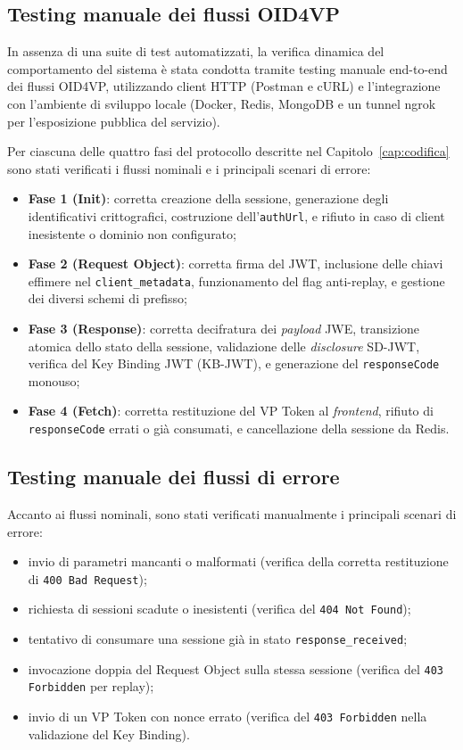 \subsection{Testing manuale dei flussi OID4VP}
In assenza di una suite di test automatizzati, la verifica dinamica del comportamento del sistema è stata condotta tramite testing manuale end-to-end dei flussi OID4VP, utilizzando client HTTP (Postman e cURL) e l'integrazione con l'ambiente di sviluppo locale (Docker, Redis, MongoDB e un tunnel ngrok per l'esposizione pubblica del servizio).

Per ciascuna delle quattro fasi del protocollo descritte nel Capitolo~\ref{cap:codifica} sono stati verificati i flussi nominali e i principali scenari di errore:

\begin{itemize}
    \item \textbf{Fase 1 (Init)}: corretta creazione della sessione, generazione degli identificativi crittografici, costruzione dell'\texttt{authUrl}, e rifiuto in caso di client inesistente o dominio non configurato;
    \item \textbf{Fase 2 (Request Object)}: corretta firma del JWT, inclusione delle chiavi effimere nel \texttt{client\_\allowbreak{}metadata}, funzionamento del flag anti-replay, e gestione dei diversi schemi di prefisso;
    \item \textbf{Fase 3 (Response)}: corretta decifratura dei \textit{payload} JWE, transizione atomica dello stato della sessione, validazione delle \textit{disclosure} SD-JWT, verifica del Key Binding JWT (KB-JWT), e generazione del \texttt{responseCode} monouso;
    \item \textbf{Fase 4 (Fetch)}: corretta restituzione del VP Token al \textit{frontend}, rifiuto di \texttt{responseCode} errati o già consumati, e cancellazione della sessione da Redis.
\end{itemize}

\subsection{Testing manuale dei flussi di errore}
Accanto ai flussi nominali, sono stati verificati manualmente i principali scenari di errore:

\begin{itemize}
    \item invio di parametri mancanti o malformati (verifica della corretta restituzione di \texttt{400 Bad Request});
    \item richiesta di sessioni scadute o inesistenti (verifica del \texttt{404 Not Found});
    \item tentativo di consumare una sessione già in stato \texttt{response\_\allowbreak{}received};
    \item invocazione doppia del Request Object sulla stessa sessione (verifica del \texttt{403 Forbidden} per replay);
    \item invio di un VP Token con nonce errato (verifica del \texttt{403 Forbidden} nella validazione del Key Binding).
\end{itemize}

